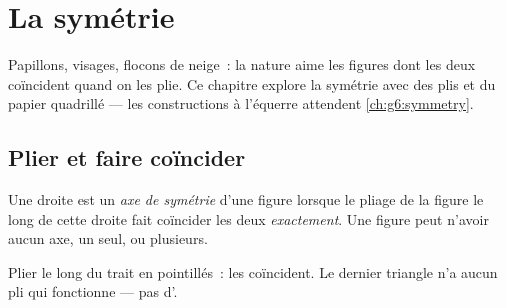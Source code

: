 \chapter{La symétrie}\label{ch:g4:symmetry}

Papillons, visages, flocons de neige~: la nature aime les figures
dont les deux  coïncident quand on les plie. Ce chapitre
explore la symétrie avec des plis et du papier quadrillé --- les
constructions à l'équerre attendent \cref{ch:g6:symmetry}.

\section{Plier et faire coïncider}

\begin{definition}\label{def:g4:symmetry:def}
Une droite est un \emph{axe de symétrie}
d'une figure lorsque le pliage de la figure le long de cette droite
fait coïncider les deux  \emph{exactement}. Une figure peut
n'avoir aucun axe, un seul, ou plusieurs.
\end{definition}

\begin{omfigure}

{\small Plier le long du trait en pointillés~: les 
coïncident. Le dernier triangle n'a aucun pli qui fonctionne ---
pas d'.}
\end{omfigure}

